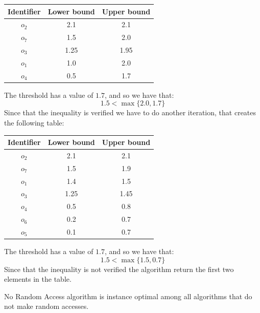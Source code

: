 \begin{example}
\begin{table}[H]
\begin{tabular}{|ccc|}
        \hline
        \textbf{Identifier} & \textbf{Lower bound} & \textbf{Upper bound} \\ \hline
        $o_2$               & 2.1                  & 2.1                  \\ 
        $o_7$               & 1.5                  & 2.0                  \\ 
        $o_3$               & 1.25                 & 1.95                 \\
        $o_1$               & 1.0                  & 2.0                  \\ 
        $o_4$               & 0.5                  & 1.7                  \\ \hline
        \end{tabular}
    \end{table}
    The threshold has a value of $1.7$, and so we have that:
    \[1.5<\max\{2.0,1.7\}\]
    Since that the inequality is verified we have to do another iteration, that creates the following table: 
    \begin{table}[H]
        \centering
        \begin{tabular}{|ccc|}
        \hline
        \textbf{Identifier} & \textbf{Lower bound} & \textbf{Upper bound} \\ \hline
        $o_2$               & 2.1                  & 2.1                  \\ 
        $o_7$               & 1.5                  & 1.9                  \\ 
        $o_1$               & 1.4                  & 1.5                  \\ 
        $o_3$               & 1.25                 & 1.45                 \\ 
        $o_4$               & 0.5                  & 0.8                  \\ 
        $o_6$               & 0.2                  & 0.7                  \\ 
        $o_5$               & 0.1                  & 0.7                  \\ \hline
        \end{tabular}
    \end{table}
    The threshold has a value of $1.7$, and so we have that:
    \[1.5<\max\{1.5,0.7\}\]
    Since that the inequality is not verified the algorithm return the first two elements in the table. 
\end{example}
\begin{property}
    No Random Access algorithm is instance optimal among all algorithms that do not make random accesses.
\end{property}

